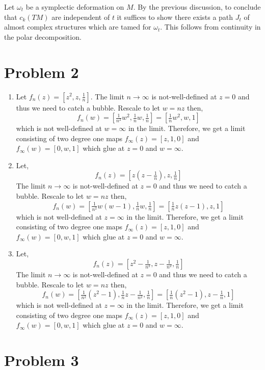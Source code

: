 \documentclass[12pt]{article}
\begin{document}
Let $\omega_t$ be a symplectic deformation on $M$. By the previous discussion, to conclude that $c_k(TM)$ are independent of $t$ it suffices to show there exists a path $J_t$ of almost complex structures which are tamed for $\omega_t$. This follows from continuity in the polar decomposition. 

\section{Problem 2}

\begin{enumerate}
\item Let $f_n(z) = [z^2, z, \tfrac{1}{n}]$. The limit $n \to \infty$ is not-well-defined at $z = 0$ and thus we need to catch a bubble. Rescale to let $w = n z$ then, 
\[ f_n(w) = [ \tfrac{1}{n^2} w^2, \tfrac{1}{n} w, \tfrac{1}{n}] = [ \tfrac{1}{n} w^2, w, 1] \]
which is not well-defined at $w = \infty$ in the limit. Therefore, we get a limit consisting of two degree one maps $f_{\infty}(z) = [z, 1, 0]$ and $f_{\infty}(w) = [0, w, 1]$ which glue at $z = 0$ and $w = \infty$.

\item Let,
\[ f_n(z) = [z(z-\tfrac{1}{n}), z, \tfrac{1}{n}] \]
The limit $n \to \infty$ is not-well-defined at $z = 0$ and thus we need to catch a bubble. Rescale to let $w = n z$ then, 
\[ f_n(w) = [ \tfrac{1}{n^2} w(w-1), \tfrac{1}{n} w, \tfrac{1}{n}] = [ \tfrac{1}{n} z(z-1), z, 1] \]
which is not well-defined at $z = \infty$ in the limit. Therefore, we get a limit consisting of two degree one maps $f_{\infty}(z) = [z, 1, 0]$ and $f_{\infty}(w) = [0, w, 1]$ which glue at $z = 0$ and $w = \infty$.

\item Let,
\[ f_n(z) = [z^2 - \tfrac{1}{n^2}, z - \tfrac{1}{n^2}, \tfrac{1}{n}] \]
The limit $n \to \infty$ is not-well-defined at $z = 0$ and thus we need to catch a bubble. Rescale to let $w = n z$ then, 
\[ f_n(w) = [ \tfrac{1}{n^2} (z^2-1), \tfrac{1}{n} z - \tfrac{1}{n^2}, \tfrac{1}{n} ] = [ \tfrac{1}{n} (z^2 - 1), z - \tfrac{1}{n}, 1] \]
which is not well-defined at $z = \infty$ in the limit. Therefore, we get a limit consisting of two degree one maps $f_{\infty}(z) = [z, 1, 0]$ and $f_{\infty}(w) = [0, w, 1]$ which glue at $z = 0$ and $w = \infty$.
\end{enumerate}

\section{Problem 3}
\end{document}
